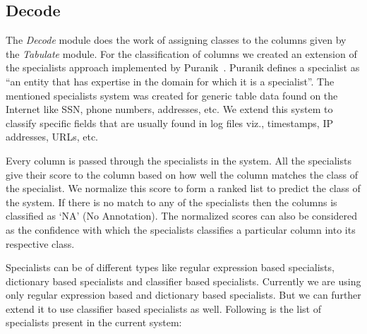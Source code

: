 \subsection{Decode}
\label{Decode}

The \textit{Decode} module does the work of assigning classes to the columns given by the \textit{Tabulate} module. For the classification of columns we created an extension of the specialists approach implemented by Puranik~\cite{puranik2012specialist}. Puranik defines a specialist as ``an entity that has expertise in the domain for which it is a specialist''. The mentioned specialists system was created for generic table data found on the Internet like SSN, phone numbers, addresses, etc. We extend this system to classify specific fields that are usually found in log files viz., timestamps, IP addresses, URLs, etc.

Every column is passed through the specialists in the system. All the specialists give their score to the column based on how well the column matches the class of the specialist. We normalize this score to form a ranked list to predict the class of the system. If there is no match to any of the specialists then the columns is classified as `NA' (No Annotation). The normalized scores can also be considered as the confidence with which the specialists classifies a particular column into its respective class.

Specialists can be of different types like regular expression based specialists, dictionary based specialists and classifier based specialists. Currently we are using only regular expression based and dictionary based specialists. But we can further extend it to use classifier based specialists as well. Following is the list of specialists present in the current system:

